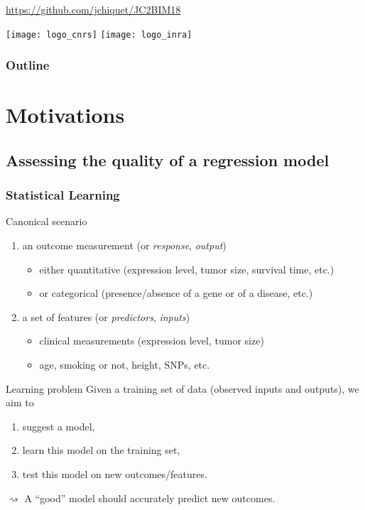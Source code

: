 \documentclass[10pt, c, xcolor=x11names]{beamer}\usepackage[]{graphicx}\usepackage[]{color}
\title{\currentCourse}
\subtitle{\huge\currentChapter\normalsize}
\institute{\currentInstitute}
\date{\currentDate}
\newcommand{\dotitlepage}{%
  \begin{frame}
    \titlepage
    \vfill
    \begin{center}
        \scriptsize\url{https://github.com/jchiquet/JC2BIM18}
    \end{center}
    \vfill
    \texttt{[image: logo\_cnrs]}\hfill
    \texttt{[image: logo\_inra]}
  \end{frame}
}
\newcommand{\dotoc}{%
  \begin{frame}
    \frametitle{Outline}
    \tableofcontents[currentsection,
    sectionstyle=show/show,
    subsectionstyle=hide]
  \end{frame}
}
\begin{document}
\dotitlepage

\dotoc

\section{Motivations}


\subsection{Assessing the quality of a regression model}

\begin{frame}
  \frametitle{Statistical Learning}

  \begin{block}{Canonical scenario}
    \begin{enumerate}
    \item an \alert{outcome} measurement (or \emph{response}, \emph{output})
      \begin{itemize}
      \item  either   quantitative  (expression  level,   tumor  size,
        survival time, etc.)
      \item or categorical (presence/absence of a gene or of a disease, etc.)
      \end{itemize}
    \item a set of  \alert{features} (or \emph{predictors}, \emph{inputs})
      \begin{itemize}
      \item clinical measurements (expression level, tumor size)
      \item age, smoking or not, height, SNPs, etc.
      \end{itemize}
    \end{enumerate}
  \end{block}

  \vfill

  \begin{block}{Learning problem} Given a training set of data (observed
    inputs and outputs), we aim to
    \begin{enumerate}
    \item suggest a model,
    \item learn this model on the training set,
    \item test this model on new outcomes/features.
    \end{enumerate}
  \end{block}

  \vfill

  $\rightsquigarrow$   \alert{A  ``good''   model  should   accurately
    predict new outcomes.}
\end{frame}
\end{document}
